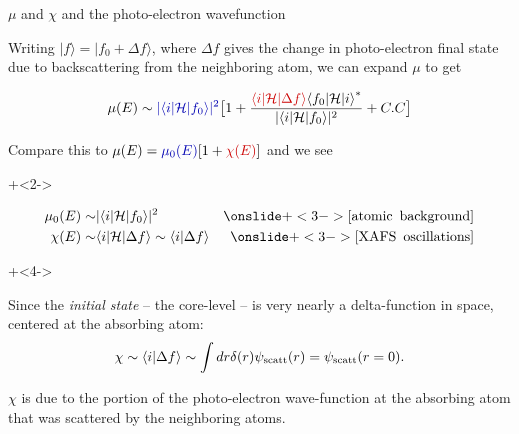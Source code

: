 \begin{slide}{$\mu$ and $\chi$ and the photo-electron wavefunction}

  \begin{cenpage}{107mm}

    Writing $ {| f \rangle = | f_0 + \Delta f \rangle} $, where $\Delta f$
    gives the change in photo-electron final state due to backscattering
    from the neighboring atom, we can expand $\mu$ to get

    \[ {\mu(E) \sim {\Blue{| \langle i | {\cal{H}} | f_0 \rangle |^2}}
    \bigl[ 1 +
    {   \frac{  {\Red{\langle i | {\cal{H}} | \Delta f \rangle}}
        {\langle f_0 | {\cal{H}} | i \rangle }^{*}
      } { | \langle i | {\cal{H}} | f_0 \rangle |^2 } }  + C.C \bigr] }  \]


\vmm \vmm  Compare this to $ \mu(E) = {\Blue{\mu_0(E)}} [ 1 +
  {\Red{\chi(E)}}] $ and we see
  {
    \onslide+<2->\vspace{-1mm}
    \begin{center} \begin{eqnarray*}
      {\mu_0(E) } \sim&  {| \langle i | {\cal{H}} | f_0 \rangle |^2}  &
      \onslide+<3->   {\mathrm{[atomic \,\,\,background]} } \\
      \chi(E) \sim& \langle i | {\cal{H}} | \Delta f \rangle \sim
      \langle i | \Delta f \rangle  &
      \onslide+<3->  {\mathrm{[XAFS \,\,\,oscillations]}}
    \end{eqnarray*}\end{center} \vspace{-1mm}
  }

  {
    \onslide+<4->
    {Since the {\emph{initial state}} -- the core-level -- is very nearly a
    delta-function in space, centered at the absorbing atom:
    \[ {\chi \sim \langle i | \Delta f \rangle \sim \int dr \delta(r)
      \psi_{\rm{scatt}}(r)  =  \psi_{\rm{scatt}}(r=0). }\]


\vspace{-3mm}

  \begin{center}
    \begin{postitbox}{92mm}\vspace{-4mm}\justify
        $\chi$ is due to the portion of the photo-electron wave-function at the
        absorbing atom that was scattered by the neighboring atoms.
      \end{postitbox}
    \end{center}

} }
\end{cenpage}


\end{slide}
